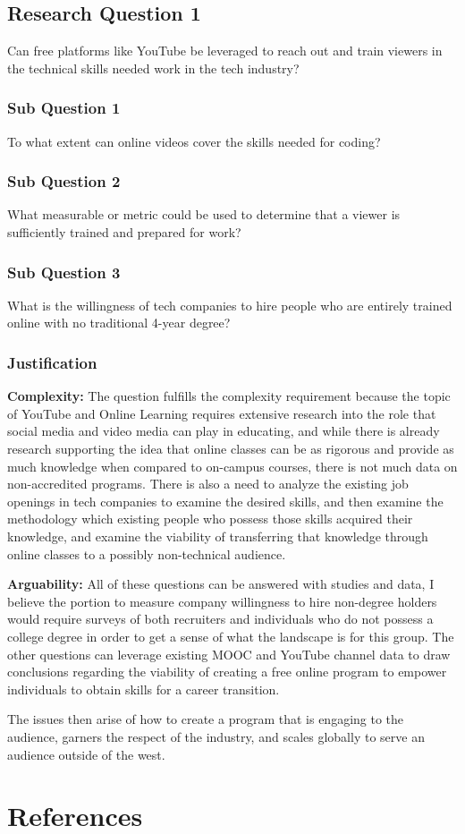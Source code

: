 \documentclass[
	letterpaper, %
]{jdf}
\begin{document}
\subsection{Research Question 1}
Can free platforms like YouTube be leveraged to reach out and train viewers in the technical skills needed work in the tech industry?
\subsubsection{Sub Question 1}
To what extent can online videos cover the skills needed for coding?
\subsubsection{Sub Question 2}
What measurable or metric could be used to determine that a viewer is sufficiently trained and prepared for work? 
\subsubsection{Sub Question 3}
What is the willingness of tech companies to hire people who are entirely trained online with no traditional 4-year degree? 
\subsubsection{Justification}
\textbf{Complexity:} The question fulfills the complexity requirement because the topic of YouTube and Online Learning requires extensive research into the role that social media and video media can play in educating, and while there is already research supporting the idea that online classes can be as rigorous and provide as much knowledge when compared to on-campus courses, there is not much data on non-accredited programs. There is also a need to analyze the existing job openings in tech companies to examine the desired skills, and then examine the methodology which existing people who possess those skills acquired their knowledge, and examine the viability of transferring that knowledge through online classes to a possibly non-technical audience.

\textbf{Arguability:} All of these questions can be answered with studies and data, I believe the portion to measure company willingness to hire non-degree holders would require surveys of both recruiters and individuals who do not possess a college degree in order to get a sense of what the landscape is for this group. The other questions can leverage existing MOOC and YouTube channel data to draw conclusions regarding the viability of creating a free online program to empower individuals to obtain skills for a career transition. 

The issues then arise of how to create a program that is engaging to the audience, garners the respect of the industry, and scales globally to serve an audience outside of the west. 

\section{References}
\printbibliography[heading=none]
\end{document}
